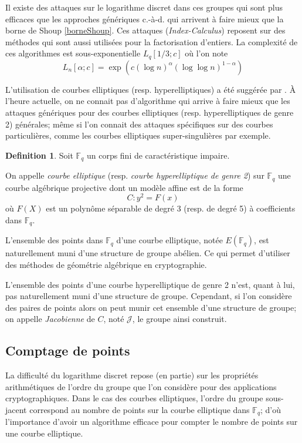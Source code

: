 \documentclass[a4paper,12pt]{article}
\theoremstyle{definition}
\newtheorem{definition}{Definition}[section]
\theoremstyle{remark}
\numberwithin{equation}{section}
\begin{document}
Il existe des attaques sur le logarithme discret dans ces groupes qui sont plus efficaces que les approches génériques c.-à-d. qui arrivent à faire mieux que la borne de Shoup \ref{borneShoup}. Ces attaques (\emph{Index-Calculus}) reposent sur des méthodes qui sont aussi utilisées pour la factorisation d'entiers. La complexité de ces algorithmes est sous-exponentielle $L_q[1/3;c]$ où l'on note
$$L_n[\alpha;c] = \exp(c(\log n)^\alpha(\log \log n)^{1-\alpha})$$

L'utilisation de courbes elliptiques (resp. hyperelliptiques) a été suggérée par \citet{koblitz1,koblitz2}. À l'heure actuelle, on ne connait pas d'algorithme qui arrive à faire mieux que les attaques génériques pour des courbes elliptiques (resp. hyperelliptiques de genre 2) générales; même si l'on connait des attaques spécifiques sur des courbes particulières, comme les courbes elliptiques super-singulières par exemple.

\begin{definition}
Soit $\mathbb{F}_q$ un corps fini de caractéristique impaire.

On appelle \emph{courbe elliptique} (resp. \emph{courbe hyperelliptique de genre 2}) sur $\mathbb{F}_q$ une courbe algébrique projective dont un modèle affine est de la forme
$$C : y^2 = F(x)$$
où $F(X)$ est un polynôme séparable de degré 3 (resp. de degré 5) à coefficients dans $\mathbb{F}_q$.
\end{definition}

L'ensemble des points dans $\mathbb{F}_q$ d'une courbe elliptique, notée $E(\mathbb{F}_q)$, est naturellement muni d'une structure de groupe abélien. Ce qui permet d'utiliser des méthodes de géométrie algébrique en cryptographie.

L'ensemble des points d'une courbe hyperelliptique de genre 2 n'est, quant à lui, pas naturellement muni d'une structure de groupe. Cependant, si l'on considère des paires de points alors on peut munir cet ensemble d'une structure de groupe; on appelle \emph{Jacobienne} de $C$, noté $\mathcal{J}$, le groupe ainsi construit.

\subsection{Comptage de points}
La difficulté du logarithme discret repose (en partie) sur les propriétés arithmétiques de l'ordre du groupe que l'on considère pour des applications cryptographiques. Dans le cas des courbes elliptiques, l'ordre du groupe sous-jacent correspond au nombre de points sur la courbe elliptique dans $\mathbb{F}_q$; d'où l'importance d'avoir un algorithme efficace pour compter le nombre de points sur une courbe elliptique.
\end{document}
